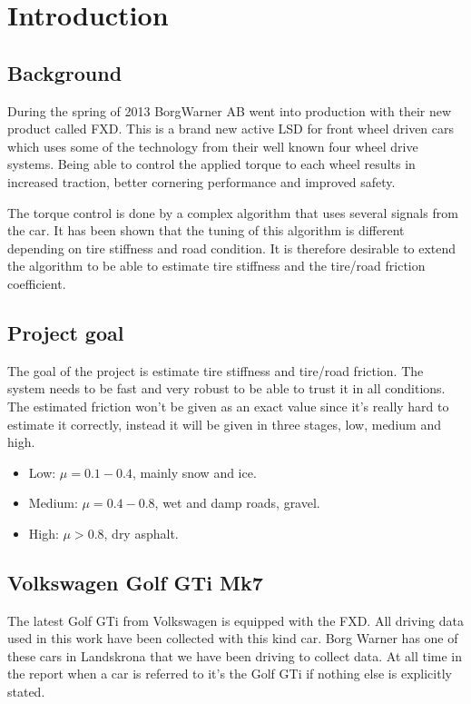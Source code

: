 \chapter{Introduction}

\section{Background}
During the spring of 2013 BorgWarner AB went into production with their new product called FXD. This is a brand new active LSD for front wheel driven cars which uses some of the technology from their well known four wheel drive systems. Being able to control the applied torque to each wheel results in increased traction, better cornering performance and improved safety.

The torque control is done by a complex algorithm that uses several signals from the car. It has been shown that the tuning of this algorithm is different depending on tire stiffness and road condition. It is therefore desirable to extend the algorithm to be able to estimate tire stiffness and the tire/road friction coefficient.


\section{Project goal}
The goal of the project is estimate tire stiffness and tire/road friction. The system needs to be fast and very robust to be able to trust it in all conditions. The estimated friction won't be given as an exact value since it's really hard to estimate it correctly, instead it will be given in three stages, low, medium and high.

\begin{itemize}
	\item Low: $ \mu = 0.1-0.4 $, mainly snow and ice.
	\item Medium: $ \mu = 0.4-0.8 $, wet and damp roads, gravel.
	\item High: $ \mu > 0.8 $, dry asphalt.
\end{itemize}

\section{Volkswagen Golf GTi Mk7}
The latest Golf GTi from Volkswagen is equipped with the FXD. All driving data used in this work have been collected with this kind car. Borg Warner has one of these cars in Landskrona that we have been driving to collect data. At all time in the report when a car is referred to it's the Golf GTi if nothing else is explicitly stated.

